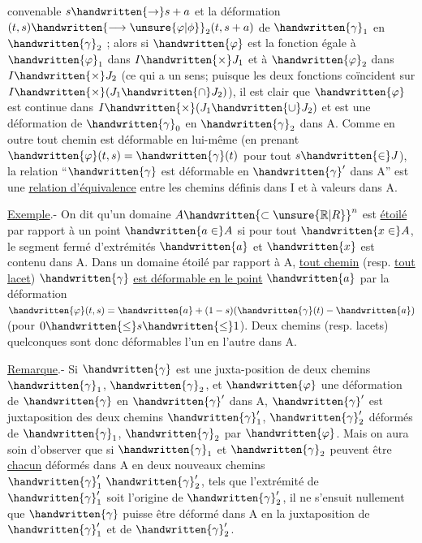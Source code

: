 convenable $s\handwritten{\to}s+a$ et la déformation $(t,s)\handwritten{\longrightarrow\unsure{\varphi|\phi}}_2(t,s+a)$ de $\handwritten{\gamma}_1$ en $\handwritten{\gamma}_2$ ; alors si $\handwritten{\varphi}$ est la fonction égale à $\handwritten{\varphi}_1$ dans $I\handwritten{\times}J_1$ et à $\handwritten{\varphi}_2$ dans $I\handwritten{\times}J_2$ (ce qui a un sens; puisque les deux fonctions coïncident sur $I\handwritten{\times}(J_1\handwritten{\cap}J_2)$), il est clair que $\handwritten{\varphi}$ est continue dans $I\handwritten{\times}(J_1\handwritten{\cup}J_2)$ et est une déformation de $\handwritten{\gamma}_0$ en $\handwritten{\gamma}_2$ dans A. Comme en outre tout chemin est déformable en lui-même (en prenant $\handwritten{\varphi}(t,s)=\handwritten{\gamma}(t)$ pour tout $s\handwritten{\in}J$), la relation ``$\handwritten{\gamma}$ est déformable en $\handwritten{\gamma}'$ dans A'' est une \uline{relation d'équivalence} entre les chemins définis dans I et à valeurs dans A.

\uline{Exemple}.- On dit qu'un domaine $A\handwritten{\subset\unsure{\mathbb{R}|R}}^n$ est \uline{étoilé} par rapport à un point $\handwritten{a\in}A$ si pour tout $\handwritten{x\in}A$, le segment fermé d'extrémités $\handwritten{a}$ et $\handwritten{x}$ est contenu dans A. Dans un domaine étoilé par rapport à A, \uline{tout chemin} (resp. \uline{tout lacet}) $\handwritten{\gamma}$ \uline{est déformable en le point} $\handwritten{a}$ par la déformation $\handwritten{\varphi}(t,s)=\handwritten{a}+(1-s)(\handwritten{\gamma}(t)-\handwritten{a})$ (pour $0\handwritten{\leq}s\handwritten{\leq}1$). Deux chemins (resp. lacets) quelconques sont donc déformables l'un en l'autre dans A.

\uline{Remarque}.- Si $\handwritten{\gamma}$ est une juxta-position de deux chemins $\handwritten{\gamma}_1$, $\handwritten{\gamma}_2$, et $\handwritten{\varphi}$ une déformation de $\handwritten{\gamma}$ en $\handwritten{\gamma}'$ dans A, $\handwritten{\gamma}'$ est juxtaposition des deux chemins $\handwritten{\gamma}'_1$, $\handwritten{\gamma}'_2$ déformés de $\handwritten{\gamma}_1$, $\handwritten{\gamma}_2$ par $\handwritten{\varphi}$. Mais on aura soin d'observer que si $\handwritten{\gamma}_1$ et $\handwritten{\gamma}_2$ peuvent être \uline{chacun} déformés dans A en deux nouveaux chemins $\handwritten{\gamma}'_1\ \handwritten{\gamma}'_2$, tels que l'extrémité de $\handwritten{\gamma}'_1$ soit l'origine de $\handwritten{\gamma}'_2$, il ne s'ensuit nullement que $\handwritten{\gamma}$ puisse être déformé dans A en la juxtaposition de $\handwritten{\gamma}'_1$ et de $\handwritten{\gamma}'_2$.

